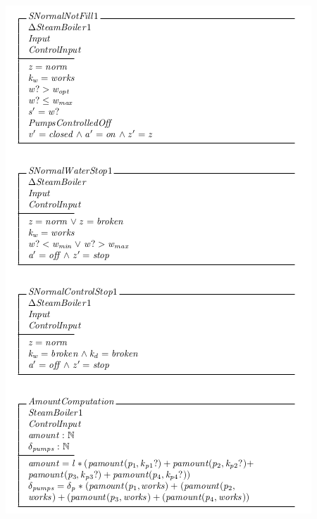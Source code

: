 \begin{center}
    \noindent \includegraphics[scale=0.8]{examples/steamboiler/0h.png}
\end{center}

